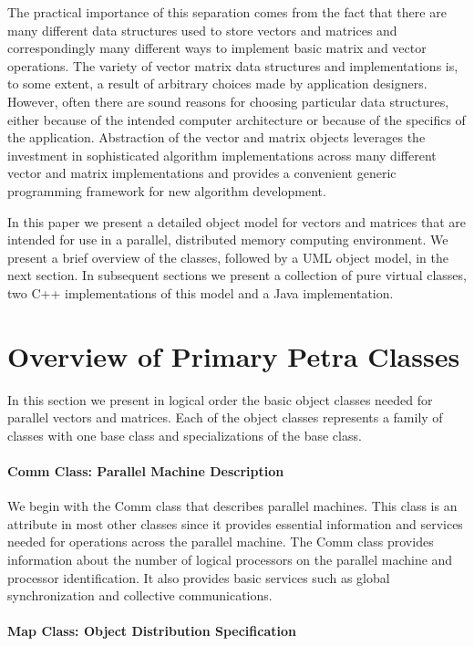 \documentclass[12pt,relax]{PetraObjectModel}
\begin{document}
The practical importance of this separation comes from the fact 
that there are many different data structures used to store 
vectors and matrices and correspondingly many different ways 
to implement basic matrix and vector operations.  The variety 
of vector matrix data structures and implementations is, to 
some extent, a result of arbitrary choices made by application 
designers.  However, often there are sound reasons for choosing 
particular data structures, either because of the intended 
computer architecture or because of the specifics of the 
application.  Abstraction of the vector and matrix objects 
leverages the investment in sophisticated algorithm implementations 
across many different vector and matrix implementations and 
provides a convenient generic programming framework for new 
algorithm development.

In this paper we present a detailed object model for vectors 
and matrices that are intended for use in a parallel, distributed 
memory computing environment.  We present a brief overview of 
the classes, followed by a UML object model, in the next section.
In subsequent sections we present a collection of pure virtual
classes, two C++ implementations of this model and a Java
implementation.


\section{Overview of Primary Petra Classes}

In this section we present in logical order the basic object classes 
needed for parallel vectors and matrices.  Each of the object
classes represents a family of classes with one base class and 
specializations of the base class.

\paragraph{Comm Class:  Parallel Machine Description}

We begin with the Comm class that describes parallel machines.  
This class is an attribute in most other classes since it provides 
essential information and services needed for operations across the 
parallel machine.  The Comm class provides information about the number 
of  logical processors on the parallel machine and processor identification.
It also provides basic services such as global synchronization and collective 
communications.

\paragraph{Map Class: Object Distribution Specification}
\end{document}

